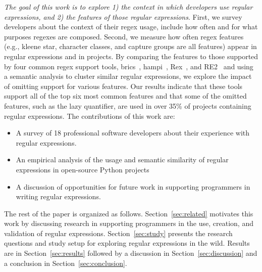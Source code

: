 \emph{The goal of this work is to explore 1) the context in which developers use regular expressions, and 2) the features of those regular expressions}. 
First, we survey developers about the context of their regex usage, include how often and for what purposes regexes are composed. 
Second, we measure how often regex features (e.g., kleene star, character classes, and capture groups are all features) appear in regular expressions and in projects. 
By comparing the features to those supported by four common regex support tools, brics~\cite{brics}, hampi~\cite{hampi}, Rex~\cite{rex}, and RE2~\cite{re2} and using a semantic analysis to cluster similar regular expressions, 
we explore the impact of omitting support for various features. 
Our results indicate that these tools support all of the top six most common features and that some of the omitted features, such as the lazy quantifier, are used in over 35\% of projects containing regular expressions.
The contributions of this work are:
\begin{itemize}
	\item A survey of 18 professional software developers about their experience with regular expressions.
	\item An empirical analysis of the usage and semantic similarity of regular expressions in  open-source Python projects
	\item A discussion of opportunities for future work in supporting programmers in writing regular expressions.
\end{itemize}

The rest of the paper is organized as follows. Section~\ref{sec:related} motivates this work by discussing research in supporting programmers in the use, creation, and validation of regular expressions. Section~\ref{sec:study} presents the research questions and study setup for exploring regular expressions in the wild. Results are in Section~\ref{sec:results} followed by a discussion in Section~\ref{sec:discussion} and a conclusion in Section~\ref{sec:conclusion}.
